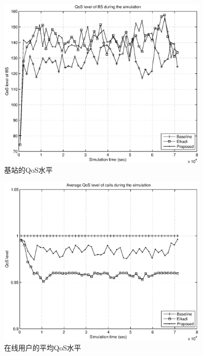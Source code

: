 %
\begin{figure}[htb]
\centering
\includegraphics[width=4in] {clock_bs_qos_sum.eps}
\caption{基站的QoS水平}\label{cacop_pic_clock_bs_qos_sum}
\end{figure}

% 
\begin{figure}[htb]
\centering
\includegraphics[width=4in] {clock_avg_call_qos.eps}
\caption{在线用户的平均QoS水平}\label{cacop_pic_clock_avg_call_qos}
\end{figure}
\fi
